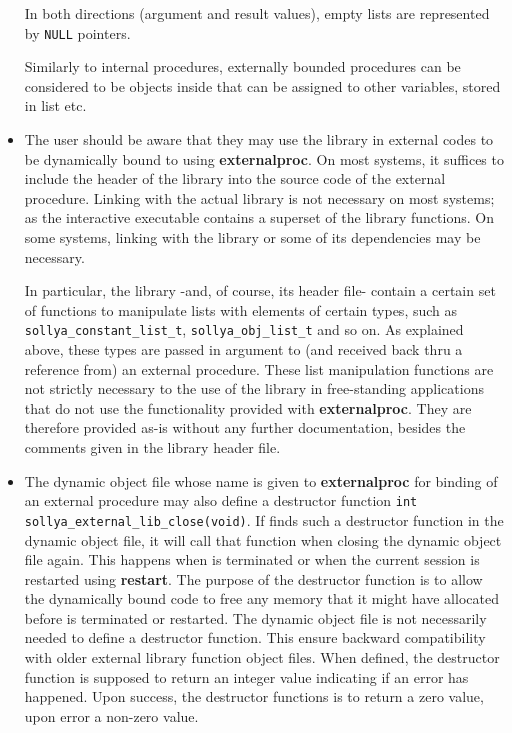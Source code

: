 \begin{itemize}
   In both directions (argument and result values), empty lists are represented
   by \texttt{NULL} pointers.
    
   Similarly to internal procedures, externally bounded procedures can be
   considered to be objects inside \sollya that can be assigned to other
   variables, stored in list etc.

\item The user should be aware that they may use the \sollya library in
   external codes to be dynamically bound to \sollya using \textbf{externalproc}. On
   most systems, it suffices to include the header of the \sollya library
   into the source code of the external procedure. Linking with the
   actual \sollya library is not necessary on most systems; as the
   interactive \sollya executable contains a superset of the \sollya
   library functions. On some systems, linking with the \sollya library
   or some of its dependencies may be necessary.
    
   In particular, the \sollya library -and, of course, its header file-
   contain a certain set of functions to manipulate lists with elements
   of certain types, such as
   \verb|sollya_constant_list_t|,
   \verb|sollya_obj_list_t| and so on. As explained
   above, these types are passed in argument to (and received back thru a
   reference from) an external procedure. These list manipulation
   functions are not strictly necessary to the use of the \sollya library
   in free-standing applications that do not use the functionality
   provided with \textbf{externalproc}. They are therefore provided as-is without any
   further documentation, besides the comments given in the \sollya
   library header file.

\item The dynamic object file whose name is given to \textbf{externalproc} for binding of an
   external procedure may also define a destructor function \verb|int sollya_external_lib_close(void)|.
   If \sollya finds such a destructor function in the dynamic object file, it will call 
   that function when closing the dynamic object file again. This happens when \sollya
   is terminated or when the current \sollya session is restarted using \textbf{restart}.
   The purpose of the destructor function is to allow the dynamically bound code
   to free any memory that it might have allocated before \sollya is terminated 
   or restarted. 
   The dynamic object file is not necessarily needed to define a destructor
   function. This ensure backward compatibility with older \sollya external 
   library function object files.
   When defined, the destructor function is supposed to return an integer
   value indicating if an error has happened. Upon success, the destructor
   functions is to return a zero value, upon error a non-zero value.
\end{itemize}

